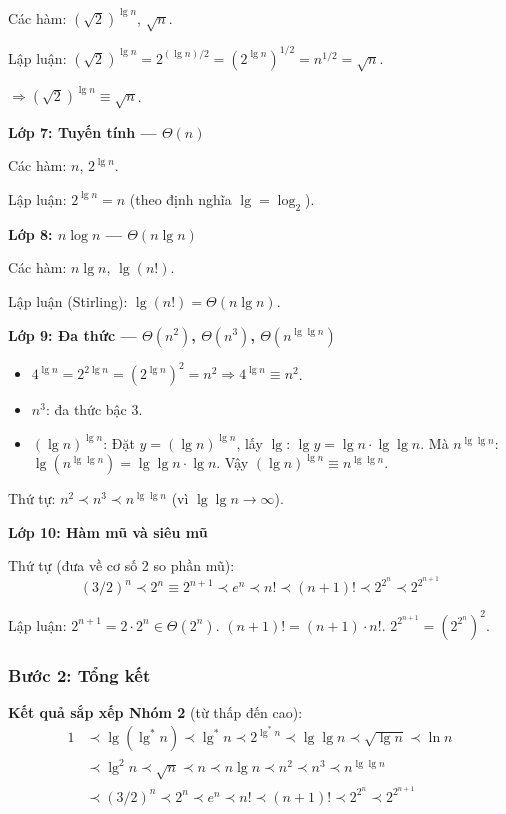 \documentclass[12pt,a4paper]{article}
\begin{document}
Các hàm: $(\sqrt{2})^{\lg n}$, $\sqrt{n}$.

Lập luận: $(\sqrt{2})^{\lg n} = 2^{(\lg n)/2} = (2^{\lg n})^{1/2} = n^{1/2} = \sqrt{n}$.

$\Longrightarrow (\sqrt{2})^{\lg n} \equiv \sqrt{n}$.

\textbf{Lớp 7: Tuyến tính --- $\Theta(n)$}

Các hàm: $n$, $2^{\lg n}$.

Lập luận: $2^{\lg n} = n$ (theo định nghĩa $\lg = \log_2$).

\textbf{Lớp 8: $n\log n$ --- $\Theta(n\lg n)$}

Các hàm: $n\lg n$, $\lg(n!)$.

Lập luận (Stirling): $\lg(n!) = \Theta(n\lg n)$.

\textbf{Lớp 9: Đa thức --- $\Theta(n^2)$, $\Theta(n^3)$, $\Theta(n^{\lg\lg n})$}

\begin{itemize}[noitemsep]
  \item $4^{\lg n} = 2^{2\lg n} = (2^{\lg n})^2 = n^2 \Longrightarrow 4^{\lg n} \equiv n^2$.
  \item $n^3$: đa thức bậc 3.
  \item $(\lg n)^{\lg n}$: Đặt $y = (\lg n)^{\lg n}$, lấy $\lg$: $\lg y = \lg n \cdot \lg\lg n$. Mà $n^{\lg\lg n}$: $\lg(n^{\lg\lg n}) = \lg\lg n \cdot \lg n$. Vậy $(\lg n)^{\lg n} \equiv n^{\lg\lg n}$.
\end{itemize}

Thứ tự: $n^2 \prec n^3 \prec n^{\lg\lg n}$ (vì $\lg\lg n \to \infty$).

\textbf{Lớp 10: Hàm mũ và siêu mũ}

Thứ tự (đưa về cơ số 2 so phần mũ):
\[
  (3/2)^n \prec 2^n \equiv 2^{n+1} \prec e^n \prec n! \prec (n+1)! \prec 2^{2^n} \prec 2^{2^{n+1}}
\]

Lập luận: $2^{n+1} = 2 \cdot 2^n \in \Theta(2^n)$. $(n+1)! = (n+1) \cdot n!$. $2^{2^{n+1}} = (2^{2^n})^2$.

\subsubsection{Bước 2: Tổng kết}

\begin{resultbox}
\textbf{Kết quả sắp xếp Nhóm 2} (từ thấp đến cao):
\begin{align*}
  1 &\prec \lg(\lg^* n) \prec \lg^* n \prec 2^{\lg^* n} \prec \lg\lg n \prec \sqrt{\lg n} \prec \ln n \\
    &\prec \lg^2 n \prec \sqrt{n} \prec n \prec n\lg n \prec n^2 \prec n^3 \prec n^{\lg\lg n} \\
    &\prec (3/2)^n \prec 2^n \prec e^n \prec n! \prec (n+1)! \prec 2^{2^n} \prec 2^{2^{n+1}}
\end{align*}
\end{resultbox}
\end{document}
